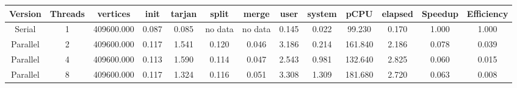\begin{tabular}{|c|c|c|c|c|c|c|c|c|c|c|c|c|}
\toprule
 Version &  Threads &   vertices &  init &  tarjan &   split &   merge &  user &  system &    pCPU &  elapsed &  Speedup &  Efficiency \\
\midrule
  Serial &        1 & 409600.000 & 0.087 &   0.085 & no data & no data & 0.145 &   0.022 &  99.230 &    0.170 &    1.000 &       1.000 \\
Parallel &        2 & 409600.000 & 0.117 &   1.541 &   0.120 &   0.046 & 3.186 &   0.214 & 161.840 &    2.186 &    0.078 &       0.039 \\
Parallel &        4 & 409600.000 & 0.113 &   1.590 &   0.114 &   0.047 & 2.543 &   0.981 & 132.640 &    2.825 &    0.060 &       0.015 \\
Parallel &        8 & 409600.000 & 0.117 &   1.324 &   0.116 &   0.051 & 3.308 &   1.309 & 181.680 &    2.720 &    0.063 &       0.008 \\
\bottomrule
\end{tabular}
